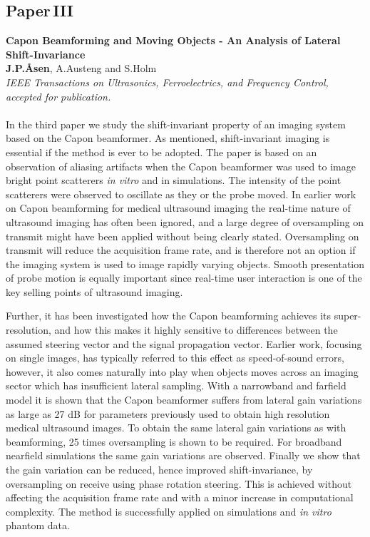 \subsection{Paper\,III}
\textbf{Capon Beamforming and Moving Objects - An Analysis of Lateral Shift-Invariance}\\
\textbf{J.\:P.\:\AA{}sen}, A.\:Austeng and S.\:Holm\\
{\it IEEE Transactions on Ultrasonics, Ferroelectrics, and Frequency Control, accepted for publication.}\\\\
In the third paper we study the shift-invariant property of an imaging system based on the Capon beamformer. As mentioned, shift-invariant imaging is essential if the method is ever to be adopted. The paper is based on an observation of aliasing artifacts when the Capon beamformer was used to image bright point scatterers \textit{in vitro} and in simulations. The intensity of the point scatterers were observed to oscillate as they or the probe moved. In earlier work on Capon beamforming for medical ultrasound imaging the real-time nature of ultrasound imaging has often been ignored, and a large degree of oversampling on transmit might have been applied without being clearly stated. Oversampling on transmit will reduce the acquisition frame rate, and is therefore not an option if the imaging system is used to image rapidly varying objects. Smooth presentation of probe motion is equally important since real-time user interaction is one of the key selling points of ultrasound imaging.

Further, it has been investigated how the Capon beamforming achieves its super-resolution, and how this makes it highly sensitive to differences between the assumed steering vector and the signal propagation vector. Earlier work, focusing on single images, has typically referred to this effect as speed-of-sound errors, however, it also comes naturally into play when objects moves across an imaging sector which has insufficient lateral sampling. With a narrowband and farfield model it is shown that the Capon beamformer suffers from lateral gain variations as large as 27 dB for parameters previously used to obtain high resolution medical ultrasound images.  To obtain the same lateral gain variations as with  beamforming, 25 times oversampling is shown to be required. For broadband nearfield simulations the same gain variations are observed. Finally we show that the gain variation can be reduced, hence improved shift-invariance, by oversampling on receive using phase rotation steering. This is achieved without affecting the acquisition frame rate and with a minor increase in computational complexity. The method is successfully applied on simulations and \textit{in vitro} phantom data.

